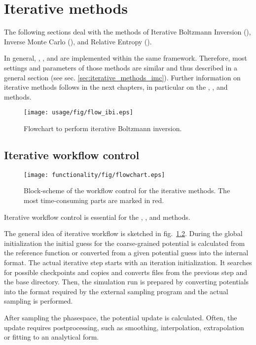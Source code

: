 \chapter{Iterative methods}
\label{sec:iterative_methods}

The following sections deal with the methods of Iterative Boltzmann Inversion
(\ibi), Inverse Monte Carlo (\imc), and Relative Entropy (\re).

In general, \ibi, \imc, and \re are implemented within the same
framework. Therefore, most settings and parameters of those methods are similar
and thus described in a general section (see
sec. \ref{sec:iterative_methods_imc}). Further information on iterative methods
follows in the next chapters, in particular on the \ibi, \imc, and \re methods.

\begin{figure}[h]
   \centering
   \texttt{[image: usage/fig/flow\_ibi.eps]}
   \caption{\label{fig:flow_ibi}Flowchart to perform iterative Boltzmann inversion.}
\end{figure}

\section{Iterative workflow control}
\label{sec:iterative_workflow}

\begin{figure}[t]
   \centering
   \texttt{[image: functionality/fig/flowchart.eps]}
   \caption{\label{fig:flowchart}Block-scheme of the workflow control for the iterative methods. The most time-consuming parts are marked in red.}
\end{figure}

Iterative workflow control is essential for the \ibi, \imc, and \re methods.

The general idea of iterative workflow is sketched in fig.~\ref{fig:flowchart}. During the global initialization the initial guess for the coarse-grained potential is calculated from the reference function or converted from a given potential guess into the internal format. The actual iterative step starts with an iteration initialization. It searches for possible checkpoints and copies and converts files from the previous step and the base directory. Then, the simulation run is prepared by converting potentials into the format required by the external sampling program and the actual sampling is performed.

After sampling the phasespace, the potential update is calculated. Often, the update requires postprocessing, such as smoothing, interpolation, extrapolation or fitting to an analytical form.

